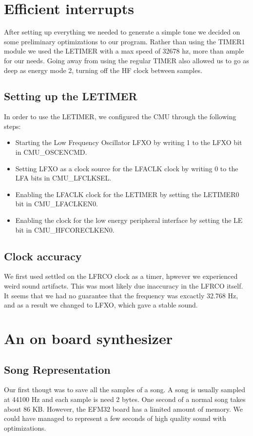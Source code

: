\section{Efficient interrupts}
After setting up everything we needed to generate a simple tone we decided on some preliminary optimizations to our program. Rather than using the TIMER1 module we used the LETIMER with a max speed of 32678 hz, more than ample for our needs. Going away from using the regular TIMER also allowed us to go as deep as energy mode 2, turning off the HF clock between samples.

\subsection{Setting up the LETIMER}
In order to use the LETIMER, we configured the CMU through the following steps:
\begin{itemize}
  \item Starting the Low Frequency Oscillator LFXO by writing 1 to the LFXO bit in CMU\_OSCENCMD.
  \item Setting LFXO as a clock source for the LFACLK clock by writing 0 to the LFA bits in CMU\_LFCLKSEL.
  \item Enabling the LFACLK clock for the LETIMER by setting the LETIMER0 bit in CMU\_LFACLKEN0.
  \item Enabling the clock for the low energy peripheral interface by setting the LE bit in CMU\_HFCORECLKEN0.
\end{itemize}

\subsection{Clock accuracy}
We first used settled on the LFRCO clock as a timer, hpwever we experienced weird sound artifacts. This was most likely due inaccuracy in the LFRCO itself. It seems that we had no guarantee that the frequency was excactly 32.768 Hz, and as a result we changed to LFXO, which gave a stable sound.


\section{An on board synthesizer}


\subsection{Song Representation}
Our first thougt was to save all the samples of a song. A song is usually sampled at 44100 Hz and each sample is need 2 bytes. One second of a normal song takes about 86 KB. However, the EFM32 board has a limited amount of memory. We could have managed to represent a few seconds of high quality sound with optimizations. 

